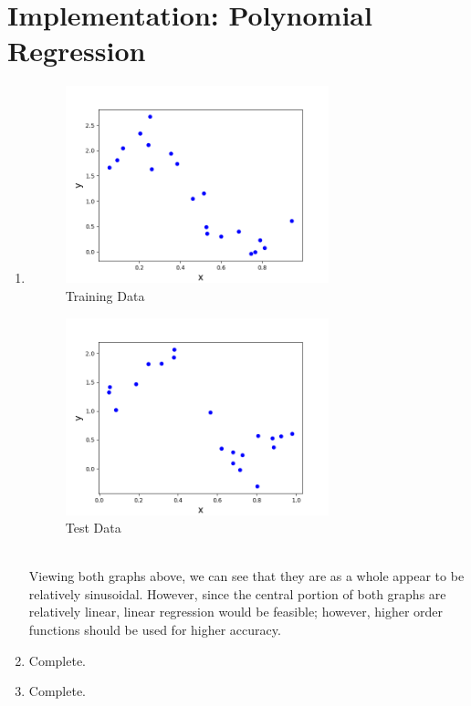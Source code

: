 \documentclass[11pt]{article}
\newcommand{\solution}[1]{{{\color{blue}{\bf Solution:} {#1}}}}
\begin{document}
\section{Implementation: Polynomial Regression}
\begin{enumerate}
\item
\solution{
\begin{figure}[!htbp]
    \centering
    \includegraphics[width=3in]{4atrain.png}
    \caption{Training Data}
\end{figure}
\begin{figure}[!htbp]
    \centering
    \includegraphics[width=3in]{4atest.png}
    \caption{Test Data}
\end{figure} \\
Viewing both graphs above, we can see that they are as a whole appear to be relatively sinusoidal. However, since the central portion of both graphs are relatively linear, linear regression would be feasible; however, higher order functions should be used for higher accuracy.
}
\newpage

\item
\solution{
Complete.
}
\item
\solution{
Complete.
}


\end{enumerate}
\end{document}
